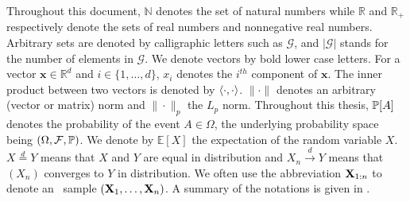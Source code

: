 Throughout this document, $\mathbb{N}$ denotes the set of natural numbers while $\mathbb{R}$ and $\mathbb{R}_+$ respectively denote the sets of real numbers and nonnegative real numbers. Arbitrary sets are denoted by calligraphic letters such as $\mathcal{G}$, and $|\mathcal{G}|$ stands for the number of elements in $\mathcal{G}$. %
%
We denote vectors by bold lower case letters. For a vector $\mathbf{x}\in\mathbb{R}^d$ and $i\in \{1,\dots,d\}$, $x_i$ denotes the $i^{th}$ component of $\mathbf{x}$. The inner product between two vectors is denoted by $\left\langle \cdot,\cdot \right\rangle$. $\|\cdot\|$ denotes an arbitrary (vector or matrix) norm and $\|\cdot\|_p$ the $L_p$ norm.
%
%
%
Throughout this thesis, $\mathbb{P}[A]$ denotes the probability of the event $A\in \Omega$, the underlying probability space being $(\Omega, \mathcal{F}, \mathbb{P})$. We denote by $\mathbb{E}[X]$ the expectation of the random variable $X$. $X \overset{d}{=} Y$ means that $X$ and $Y$ are equal in distribution and $X_n \overset{d}{\to} Y$ means that $(X_n)$ converges to $Y$ in distribution. We often use the abbreviation $\mathbf X_{1:n}$ to denote an \iid~sample $(\mathbf X_1,\ldots,\mathbf X_n)$.
%
%
A summary of the notations is given in .

